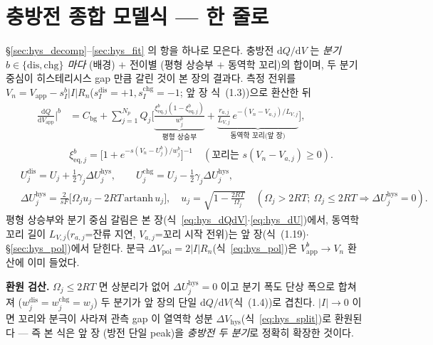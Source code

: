 \documentclass[11pt,a4paper]{article}
\newcommand{\dd}{\mathrm{d}}
\newcommand{\eq}{\mathrm{eq}}
\newcommand{\app}{\mathrm{app}}
\newcommand{\bg}{\mathrm{bg}}
\newcommand{\dis}{\mathrm{dis}}
\newcommand{\chg}{\mathrm{chg}}
\newcommand{\hys}{\mathrm{hys}}
\newcommand{\pol}{\mathrm{pol}}
\begin{document}
\section{충방전 종합 모델식 — 한 줄로}\label{sec:hys_master}
\S\ref{sec:hys_decomp}--\ref{sec:hys_fit} 의 항을 하나로 모은다. 충방전 $\dd Q/\dd V$ 는 \emph{분기
$b\in\{\dis,\chg\}$ 마다} (배경) $+$ 전이별 (평형 상승부 $+$ 동역학 꼬리)의 합이며, 두 분기 중심이 히스테리시스
gap 만큼 갈린 것이 본 장의 결과다. 측정 전위를 $V_n=V_\app-s_I^b|I|R_n$($s_I^\dis{=}{+}1,s_I^\chg{=}{-}1$; 앞 장
식~(1.3))으로 환산한 뒤
\begin{equation}
\boxed{\;\begin{aligned}
\frac{\dd Q}{\dd V_\app}\bigg|^{b}&=C_\bg+\sum_{j=1}^{N_p}Q_j\bigg[\underbrace{\frac{\xi_{\eq,j}^b(1-\xi_{\eq,j}^b)}{w_j^b}}_{\text{평형 상승부}}
+\underbrace{\frac{r_{a,j}}{L_{V,j}}\,e^{-(V_n-V_{a,j})/L_{V,j}}}_{\text{동역학 꼬리(앞 장)}}\bigg],\\[4pt]
&\xi_{\eq,j}^b=\big[1+e^{-s(V_n-U_j^b)/w_j^b}\big]^{-1}\quad(\text{꼬리는 }s(V_n-V_{a,j})\ge0).
\end{aligned}\;}
\label{eq:hys_master}
\end{equation}
\begin{equation}
\boxed{\;\begin{aligned}
&U_j^{\dis}=U_j+\tfrac12\gamma_j\Delta U_j^\hys,\qquad U_j^{\chg}=U_j-\tfrac12\gamma_j\Delta U_j^\hys,\\[4pt]
&\Delta U_j^\hys=\frac{2}{sF}\big[\Omega_j u_j-2RT\,\mathrm{artanh}\,u_j\big],\quad u_j=\sqrt{1-\tfrac{2RT}{\Omega_j}}\quad
(\Omega_j>2RT;\ \Omega_j\!\le\!2RT\Rightarrow\Delta U_j^\hys=0).
\end{aligned}\;}
\label{eq:hys_master_center}
\end{equation}
평형 상승부와 분기 중심 갈림은 본 장(식~\eqref{eq:hys_dQdV}$\cdot$\eqref{eq:hys_dU})에서, 동역학 꼬리 길이
$L_{V,j}$($r_{a,j}$=잔류 지연, $V_{a,j}$=꼬리 시작 전위)는 앞 장(식~(1.19)$\cdot$\S\ref{sec:hys_pol})에서 닫힌다.
분극 $\Delta V_\pol=2|I|R_n$(식~\eqref{eq:hys_pol})은 $V_\app^b\!\to\!V_n$ 환산에 이미 들었다.

\textbf{환원 검산.} $\Omega_j\le2RT$ 면 상분리가 없어 $\Delta U_j^\hys=0$ 이고 분기 폭도 단상 폭으로 합쳐져
($w_j^\dis\!=\!w_j^\chg\!=\!w_j$) 두 분기가 앞 장의 단일 $\dd Q/\dd V$(식~(1.4))로 겹친다. $|I|\to0$ 이면 꼬리와
분극이 사라져 관측 gap 이 열역학 성분 $\Delta V_\hys$(식~\eqref{eq:hys_split})로 환원된다 — 즉 본 식은 앞 장
(방전 단일 peak)을 \emph{충방전 두 분기}로 정확히 확장한 것이다.
\end{document}
